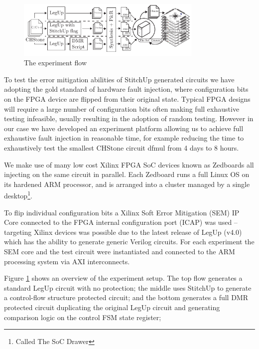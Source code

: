 \begin{figure}[t]
\centering
\includegraphics[width=3.5in]{./imgs/ExperimentFlow.pdf}
\caption{The experiment flow}
\label{fig:ExperimentFlow}
\end{figure}

To test the error mitigation abilities of StitchUp generated circuits we have adopting the
gold standard of hardware fault injection, where configuration bits on the 
FPGA device are flipped from their original state.
Typical FPGA designs will require a large number of configuration bits often making
full exhaustive testing infeasible, usually resulting in the adoption of random
testing.
However in our case we have developed an experiment
platform allowing us to achieve full exhaustive fault injection in reasonable time,
for example reducing the time to exhaustively test the smallest CHStone circuit dfmul from 4 days
to 8 hours.

We make use of many low cost Xilinx FPGA SoC devices known as
Zedboards all injecting on the same circuit in parallel.
Each Zedboard runs a full Linux OS on its hardened ARM processor, and is arranged into
a cluster managed by a single desktop\footnote{Called The SoC Drawer}.

To flip individual configuration bits a Xilinx Soft Error Mitigation (SEM) IP Core
connected to the FPGA internal configuration port (ICAP) was used --
targeting Xilinx devices was possible due to the latest release of LegUp
(v4.0) which has the ability to generate generic Verilog circuits.
For each experiment the SEM core and the test circuit were instantiated and connected to the
ARM processing system via AXI interconnects.

Figure \ref{fig:ExperimentFlow} shows an overview of the experiment setup.
The top flow generates a standard LegUp circuit with no protection;
the middle uses StitchUp to generate a control-flow structure protected circuit;
and the bottom generates a full DMR protected circuit duplicating the original LegUp
circuit and generating comparison logic on the control FSM state register;

